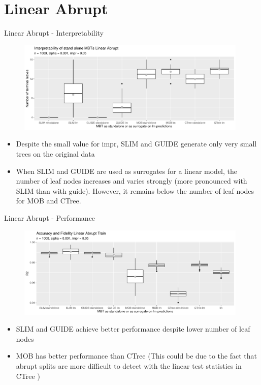 \documentclass[9pt, xcolor=table]{beamer}
\begin{document}
\section{Linear Abrupt}
\begin{frame}{Linear Abrupt - Interpretability}

\begin{figure}
    \includegraphics[width=11cm]{Figures/simulations/batchtools/basic_scenarios/linear_abrupt/la_1000_standalone_lm_int.pdf}
\end{figure}    
\begin{itemize}
    \item Despite the small value for impr, SLIM and GUIDE generate only very small trees on the original data 
    \item When SLIM and GUIDE are used as surrogates for a linear model, the number of leaf nodes increases and varies strongly (more pronounced with SLIM than with guide). However, it remains below the number of leaf nodes for MOB and CTree.
\end{itemize}
\end{frame}


\begin{frame}{Linear Abrupt - Performance}
\begin{figure}
    \includegraphics[width=11cm]{Figures/simulations/batchtools/basic_scenarios/linear_abrupt/la_1000_standalone_lm_r2_train.pdf}
\end{figure}     
\begin{itemize}
    \item SLIM and GUIDE achieve better performance despite lower number of leaf nodes
    \item MOB has better performance than CTree (This could be due to the fact that abrupt splits are more difficult to detect with the linear test statistics in CTree \citep{Schlosser.2019})
\end{itemize}
\end{frame}
\end{document}
